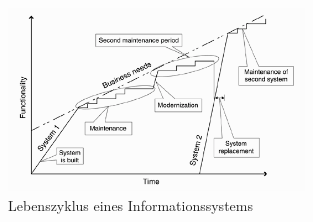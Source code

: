 \begin{figure}[bth] 
  \centering
  \includegraphics[width=0.7\textwidth]{Chapters/3-Die-Software-Entwicklung/images/LebenszyklusEinesInformationssystems.png}
  \caption{Lebenszyklus eines Informationssystems \cite{seacord_modernizing_2003}}
  \label{fig:lifecycle}
\end{figure}

